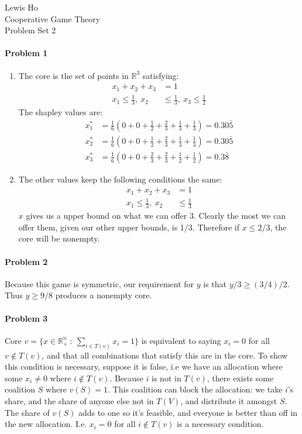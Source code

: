 \documentclass[12pt]{article}
\begin{document}
\begin{center}
  Lewis Ho\\
  Cooperative Game Theory\\
  Problem Set 2
\end{center}

\paragraph{Problem 1}
\begin{enumerate}[label=\alph*)]
\item The core is the set of points in $\mathbb{R}^3$ satisfying:
  \begin{align*}
    x_1 + x_2 + x_3 &= 1\\
    x_1 \leq \frac{1}{3},\ 
    x_2 &\leq \frac{1}{3},\ 
    x_3 \leq \frac{1}{2}
  \end{align*}
The shapley values are:
\begin{align*}
  x^*_1 &= \frac{1}{6}(0 + 0 + \frac{1}{2} + \frac{2}{3} + \frac{1}{3} + \frac{1}
          {3}) = 0.30\bar{5}\\
  x^*_2 &= \frac{1}{6}(0 + 0 + \frac{1}{2} + \frac{2}{3} + \frac{1}{3} + \frac{1}
          {3}) = 0.30\bar{5}\\
  x^*_3 &= \frac{1}{6}(0 + 0 + \frac{2}{3} + \frac{2}{3} + \frac{1}{2} + \frac{1}
          {2}) = 0.3\bar{8}
\end{align*}
\item The other values keep the following conditions the same:
  \begin{align*}
    x_1 + x_2 + x_3 &= 1\\
    x_1 \leq \frac{1}{3},\ 
    x_2 &\leq \frac{1}{3}
  \end{align*}
  $x$ gives us a upper bound on what we can offer 3. Clearly the most we can
  offer them, given our other upper bounds, is 1/3. Therefore if $x \leq 2/3$,
  the core will be nonempty.
\end{enumerate}

\paragraph{Problem 2}
Because this game is symmetric, our requirement for $y$ is that $y/3 \geq
(3/4)/2$. Thus $y \geq 9/8$ produces a nonempty core.

\paragraph{Problem 3}
Core $v = \{x\in \mathbb{R}^n_+\ :\ \sum_{i\in T(v)}x_i = 1\}$ is equivalent to
saying $x_i = 0$ for all $v\notin T(v)$, and that all combinations that satisfy
this are in the core. To show this condition is necessary, suppose it is false,
i.e we have an allocation where some $x_i \neq 0$ where $i\notin T(v)$. Because
$i$ is not in $T(v)$, there exists some coalition $S$ where $v(S) = 1$. This
coalition can block the allocation: we take $i$'s share, and the share of
anyone else not in $T(V)$, and distribute it amongst $S$. The share of $v(S)$
adds to one so it's feasible, and everyone is better than off in the new
allocation. I.e. $x_i = 0$ for all $i \notin T(v)$ is a necessary condition.
\end{document}
